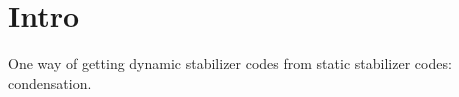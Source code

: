 \section{Intro}

One way of getting dynamic stabilizer codes from static stabilizer codes: condensation.